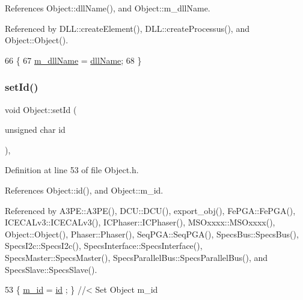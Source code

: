 References Object\+::dll\+Name(), and Object\+::m\+\_\+dll\+Name.



Referenced by D\+L\+L\+::create\+Element(), D\+L\+L\+::create\+Processus(), and Object\+::\+Object().


\begin{DoxyCode}
66                                       \{
67     \hyperlink{classObject_a01afbeacebb8db6831559972ec362eb3}{m\_dllName} = \hyperlink{classObject_a2e3947f2870094c332d7454117f3ec63}{dllName};
68   \}
\end{DoxyCode}
\mbox{\label{classObject_a398fe08cba594a0ce6891d59fe4f159f}} 
\subsubsection{\texorpdfstring{set\+Id()}{setId()}}
{\footnotesize\ttfamily void Object\+::set\+Id (\begin{DoxyParamCaption}\item[{unsigned char}]{id }\end{DoxyParamCaption})\hspace{0.3cm}{\ttfamily [inline]}, {\ttfamily [inherited]}}



Definition at line 53 of file Object.\+h.



References Object\+::id(), and Object\+::m\+\_\+id.



Referenced by A3\+P\+E\+::\+A3\+P\+E(), D\+C\+U\+::\+D\+C\+U(), export\+\_\+obj(), Fe\+P\+G\+A\+::\+Fe\+P\+G\+A(), I\+C\+E\+C\+A\+Lv3\+::\+I\+C\+E\+C\+A\+Lv3(), I\+C\+Phaser\+::\+I\+C\+Phaser(), M\+S\+Oxxxx\+::\+M\+S\+Oxxxx(), Object\+::\+Object(), Phaser\+::\+Phaser(), Seq\+P\+G\+A\+::\+Seq\+P\+G\+A(), Specs\+Bus\+::\+Specs\+Bus(), Specs\+I2c\+::\+Specs\+I2c(), Specs\+Interface\+::\+Specs\+Interface(), Specs\+Master\+::\+Specs\+Master(), Specs\+Parallel\+Bus\+::\+Specs\+Parallel\+Bus(), and Specs\+Slave\+::\+Specs\+Slave().


\begin{DoxyCode}
53 \{ \hyperlink{classObject_aca74b9dbfed7b5556ea2d56c65b6b6b0}{m\_id}    = \hyperlink{classObject_af99145335cc61ff6e2798ea17db009d2}{id}    ; \} \textcolor{comment}{//< Set Object m\_id}
\end{DoxyCode}
\mbox{\label{classObject_ae30fea75683c2d149b6b6d17c09ecd0c}} 
